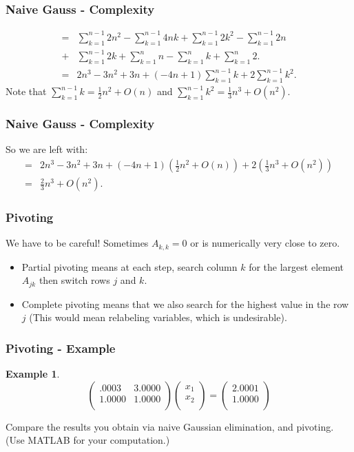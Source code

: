 \documentclass[12pt]{beamer}
\theoremstyle{definition}
\newtheorem{ex}[thm]{Example}
\begin{document}
\begin{frame}
\frametitle{Naive Gauss - Complexity}
\begin{align*}
=& \sum_{k=1}^{n-1} 2n^2 - \sum_{k=1}^{n-1}4nk +  \sum_{k=1}^{n-1}2 k^2 - \sum_{k=1}^{n-1} 2n \\
+& \sum_{k=1}^{n-1} 2k + \sum_{k = 1}^n n - \sum_{k=1}^{n} k + \sum_{k=1}^n 2.\\
=& 2n^3 - 3n^2 + 3n + (-4n+1)\sum_{k=1}^{n-1} k + 2\sum_{k=1}^{n-1} k^2.
\end{align*}
Note that $\sum_{k=1}^{n-1} k = \frac{1}{2} n^2 + O(n)$ and 
 $\sum_{k=1}^{n-1} k^2 = \frac{1}{3} n^3 + O(n^2)$.
\end{frame}


\begin{frame}
\frametitle{Naive Gauss - Complexity}

So we are left with: 
\begin{align*}
=& 2n^3 - 3n^2 + 3n + (-4n+1)(\frac{1}{2} n^2 + O(n)) + 2(\frac{1}{3}n^3 + O(n^2))\\
=& \frac{2}{3}n^3 + O(n^2).
\end{align*}
\end{frame}

\begin{frame}
\frametitle{Pivoting}
We have to be careful! Sometimes $A_{k,k} = 0$ or is
numerically very close to zero.
\begin{itemize}
\item Partial pivoting means at each step, search column $k$ for
the largest element $A_{jk}$ then switch rows $j$ and $k$.
\item Complete pivoting means that we also search for the highest
value in the row $j$ (This would mean relabeling variables, which is
undesirable).
\end{itemize}
\end{frame}

\begin{frame}
\frametitle{Pivoting - Example}

\begin{ex}
$$\left(\begin{array}{cc}
.0003 & 3.0000  \\
1.0000 & 1.0000  \\
\end{array}\right)
\left(\begin{array}{c}
x_1  \\
x_2 \\
\end{array}\right) = 
\left(\begin{array}{c}
2.0001  \\
1.0000 \\
\end{array}\right)$$
\end{ex}
Compare the results you obtain via naive Gaussian elimination,
and pivoting. (Use MATLAB for your computation.)



\end{frame}
\end{document}
